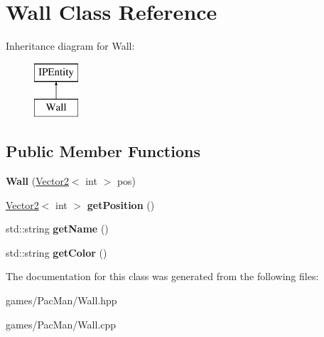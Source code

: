 \hypertarget{class_wall}{}\section{Wall Class Reference}
\label{class_wall}
Inheritance diagram for Wall\+:\begin{figure}[H]
\begin{center}
\leavevmode
\includegraphics[height=2.000000cm]{class_wall}
\end{center}
\end{figure}
\subsection*{Public Member Functions}
\begin{DoxyCompactItemize}
\item 
\mbox{\label{class_wall_a01988386e2cdb4edafcbb639de767aa4}} 
{\bfseries Wall} (\hyperlink{struct_vector2}{Vector2}$<$ int $>$ pos)
\item 
\mbox{\label{class_wall_a8a5757082a516550531c6876acfb5b3f}} 
\hyperlink{struct_vector2}{Vector2}$<$ int $>$ {\bfseries get\+Position} ()
\item 
\mbox{\label{class_wall_a7d21f02285e92accf82f558120790013}} 
std\+::string {\bfseries get\+Name} ()
\item 
\mbox{\label{class_wall_ac231beb8afadc9f83236a977162c73f8}} 
std\+::string {\bfseries get\+Color} ()
\end{DoxyCompactItemize}


The documentation for this class was generated from the following files\+:\begin{DoxyCompactItemize}
\item 
games/\+Pac\+Man/Wall.\+hpp\item 
games/\+Pac\+Man/Wall.\+cpp\end{DoxyCompactItemize}
